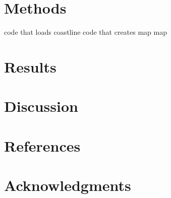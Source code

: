 \documentclass[]{article}
\begin{document}
\section{Methods}\label{methods}

code that loads coastline code that creates map map

\section{Results}\label{results}

\section{Discussion}\label{discussion}

\section{References}\label{references}

\section{Acknowledgments}\label{acknowledgments}
\end{document}

